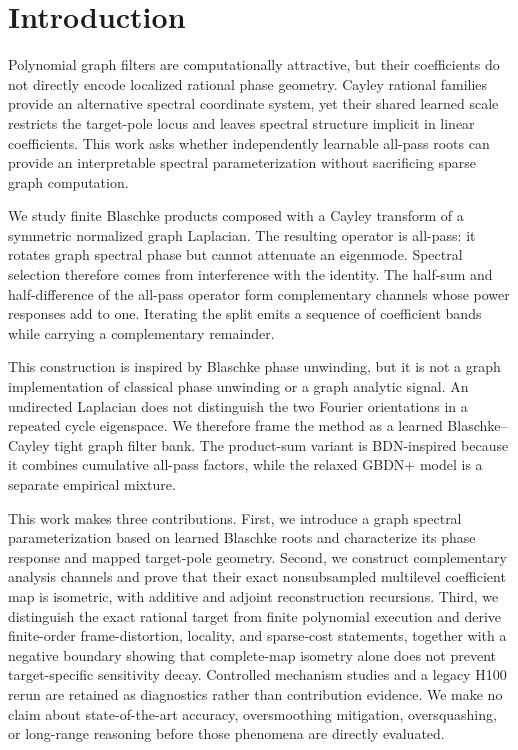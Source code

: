 \section{Introduction}
\label{sec:introduction}

Polynomial graph filters are computationally attractive, but their coefficients do not directly encode localized rational phase geometry. Cayley rational families provide an alternative spectral coordinate system, yet their shared learned scale restricts the target-pole locus and leaves spectral structure implicit in linear coefficients. This work asks whether independently learnable all-pass roots can provide an interpretable spectral parameterization without sacrificing sparse graph computation.

We study finite Blaschke products composed with a Cayley transform of a symmetric normalized graph Laplacian. The resulting operator is all-pass: it rotates graph spectral phase but cannot attenuate an eigenmode. Spectral selection therefore comes from interference with the identity. The half-sum and half-difference of the all-pass operator form complementary channels whose power responses add to one. Iterating the split emits a sequence of coefficient bands while carrying a complementary remainder.

This construction is inspired by Blaschke phase unwinding, but it is not a graph implementation of classical phase unwinding or a graph analytic signal. An undirected Laplacian does not distinguish the two Fourier orientations in a repeated cycle eigenspace. We therefore frame the method as a learned Blaschke--Cayley tight graph filter bank. The product-sum variant is BDN-inspired because it combines cumulative all-pass factors, while the relaxed GBDN+ model is a separate empirical mixture.

This work makes three contributions. First, we introduce a graph spectral parameterization based on learned Blaschke roots and characterize its phase response and mapped target-pole geometry. Second, we construct complementary analysis channels and prove that their exact nonsubsampled multilevel coefficient map is isometric, with additive and adjoint reconstruction recursions. Third, we distinguish the exact rational target from finite polynomial execution and derive finite-order frame-distortion, locality, and sparse-cost statements, together with a negative boundary showing that complete-map isometry alone does not prevent target-specific sensitivity decay. Controlled mechanism studies and a legacy H100 rerun are retained as diagnostics rather than contribution evidence. We make no claim about state-of-the-art accuracy, oversmoothing mitigation, oversquashing, or long-range reasoning before those phenomena are directly evaluated.
